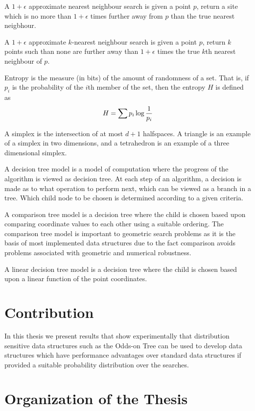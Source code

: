 \documentclass[mcs]{scsthesis}
\begin{document}
A \(1 + \epsilon\) approximate nearest neighbour search is given a point \(p\),
return a site which is no more than \(1 + \epsilon\) times further away from $p$
than the true nearest neigbhour.

A \(1 + \epsilon\) approximate \(k\)-nearest neighbour search is given a point
\(p\), return \(k\) points such than none are further away than \(1 + \epsilon\)
times the true \(k\)th nearest neighbour of $p$.

Entropy is the measure (in bits) of the amount of randomness of a set.  That is,
if \(p_i\) is the probability of the $i$th member of the set, then the entropy
\(H\) is defined as
$$
H = \sum{ p_i \log{1 \over p_i}}
$$

A simplex is the intersection of at most \(d + 1\) halfspaces. A triangle is an
example of a simplex in two dimensions, and a tetrahedron is an example of a
three dimensional simplex.

A decision tree model is a model of computation where the progress of the
algorithm is viewed as decision tree. At each step of an algorithm, a decision
is made as to what operation to perform next, which can be viewed as a branch
in a tree. Which child node to be chosen is determined according to a given
criteria.

A comparison tree model is a decision tree where the child is chosen based
upon comparing coordinate values to each other using a suitable ordering.
The comparison tree model is important to geometric search problems as it is
the basis of most implemented data structures due to the fact comparison
avoids problems associated with geometric and numerical robustness.

A linear decision tree model is a decision tree where the child is chosen based
upon a linear function of the point coordinates.

\section{Contribution}

In this thesis we present results that show experimentally that distribution
sensitive data structures such as the Odds-on Tree can be used to develop
data structures which have performance advantages over standard data structures
if provided a suitable probability distribution over the searches.

\section{Organization of the Thesis}
\end{document}
